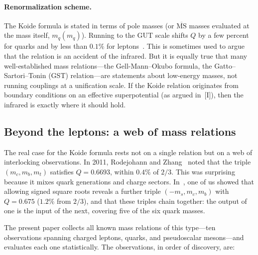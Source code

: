 \documentclass[12pt,a4paper]{article}
\begin{document}
\paragraph{Renormalization scheme.}  The Koide formula is stated in terms of pole masses (or
$\overline{\text{MS}}$ masses evaluated at the mass itself, $m_q(m_q)$).  Running to the
GUT scale shifts $Q$ by a few percent for quarks and by less than $0.1\%$ for leptons~\cite{XZZ2008,Esposito1995}.  This is sometimes used to argue that the relation is an accident of the
infrared.  But it is equally true that many well-established mass relations---the
Gell-Mann--Okubo formula, the Gatto--Sartori--Tonin (GST) relation---are statements about
low-energy masses, not running couplings at a unification scale.  If the Koide relation
originates from boundary conditions on an effective superpotential (as argued in~[I]),
then the infrared is exactly where it should hold.

\subsection{Beyond the leptons: a web of mass relations}

The real case for the Koide formula rests not on a single relation but on a web of
interlocking observations.  In 2011, Rodejohann and Zhang~\cite{RodejohannZhang2011} noted that the triple
$(m_c, m_b, m_t)$ satisfies $Q = 0.6693$, within $0.4\%$ of $2/3$.  This was surprising
because it mixes quark generations and charge sectors.  In~\cite{Rivero2012}, one of us showed that
allowing signed square roots reveals a further triple $(-m_s, m_c, m_b)$ with $Q = 0.675$
($1.2\%$ from $2/3$), and that these triples chain together: the output of one is the
input of the next, covering five of the six quark masses.

The present paper collects all known mass relations of this type---ten observations
spanning charged leptons, quarks, and pseudoscalar mesons---and evaluates each one
statistically.  The observations, in order of discovery, are:
\end{document}

